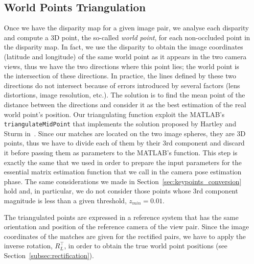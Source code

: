 \subsection{World Points Triangulation}\label{subsec:triangulation}
Once we have the disparity map for a given image pair, we analyse each
disparity and compute a 3D point, the so-called \emph{world point}, for each
non-occluded point in the disparity map.
In fact, we use the disparity to obtain the image coordinates (latitude and
longitude) of the same world point as it appears in the two camera views,
thus we have the two directions where this point lies; the world point is
the intersection of these directions.
In practice, the lines defined by these two directions do not intersect
because of errors introduced by several factors (lens
distortions, image resolution, etc.). The solution is to find the mean point of the
distance between the directions and consider it as the best estimation
of the real world point's position.
Our triangulating function exploit the MATLAB's {\tt triangulateMidPoint}
that implements the solution proposed by Hartley and Sturm
in~\cite{hartley1997triangulation}. Since our matches are located on the two
image spheres, they are 3D points, thus we have to divide each of them by their
3rd component and discard it before passing them as parameters to the
MATLAB's function. This step is exactly the same that we used in order to prepare
the input parameters for the essential matrix estimation function that we
call in the camera pose estimation phase. The same considerations we made in
Section~\ref{sec:keypoints_conversion}
hold and, in particular, we do not consider those points whose
3rd component magnitude is less than a given threshold, $z_{min} = 0.01$.

The triangulated points are expressed in a reference system that has the same
orientation and position of the reference camera of the view pair.
Since the image coordinates of the matches are given for the rectified pairs,
we have to apply the inverse rotation, $R_L^\top$, in order to obtain the true
world point positions (see Section~\ref{subsec:rectification}).

